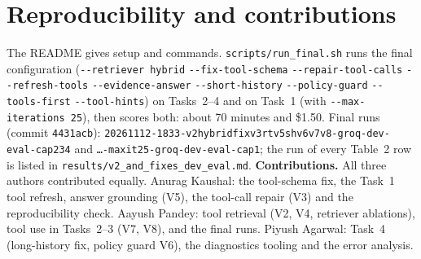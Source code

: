 \documentclass[10pt]{article}
\newcommand{\fl}[1]{\texttt{-{}-#1}}
\begin{document}
\section{Reproducibility and contributions}
The README gives setup and commands. \texttt{scripts/run\_final.sh} runs the final configuration
(\fl{retriever hybrid} \fl{fix-tool-schema} \fl{repair-tool-calls} \fl{refresh-tools}
\fl{evidence-answer} \fl{short-history} \fl{policy-guard} \fl{tools-first} \fl{tool-hints}) on
Tasks~2--4 and on Task~1 (with \fl{max-iterations 25}), then scores both: about 70 minutes and
\$1.50. Final runs (commit \texttt{4431acb}):
\texttt{20261112-1833-v2hybridfixv3rtv5shv6v7v8-groq-dev-eval-cap234} and
\texttt{\ldots-maxit25-groq-dev-eval-cap1}; the run of every Table~2 row is listed in
\texttt{results/v2\_and\_fixes\_dev\_eval.md}.
\textbf{Contributions.} All three authors contributed equally. Anurag Kaushal: the tool-schema fix,
the Task~1 tool refresh, answer grounding (V5), the tool-call repair (V3) and the reproducibility
check. Aayush Pandey: tool retrieval (V2, V4, retriever ablations), tool use in Tasks~2--3 (V7,
V8), and the final runs. Piyush Agarwal: Task~4 (long-history fix, policy guard
V6), the diagnostics tooling and the error analysis.
\end{document}
